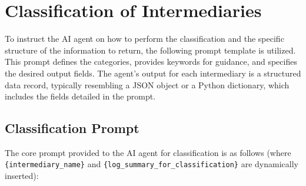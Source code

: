 \newpage 

\section{Classification of Intermediaries}
\label{sec:appendix_intermediary_classification}

To instruct the AI agent on how to perform the classification and the specific structure of the information to return, the following prompt template is utilized. This prompt defines the categories, provides keywords for guidance, and specifies the desired output fields. The agent's output for each intermediary is a structured data record, typically resembling a JSON object or a Python dictionary, which includes the fields detailed in the prompt.

\subsection*{Classification Prompt}
The core prompt provided to the AI agent for classification is as follows (where \texttt{\{intermediary\_name\}} and \texttt{\{log\_summary\_for\_classification\}} are dynamically inserted):
